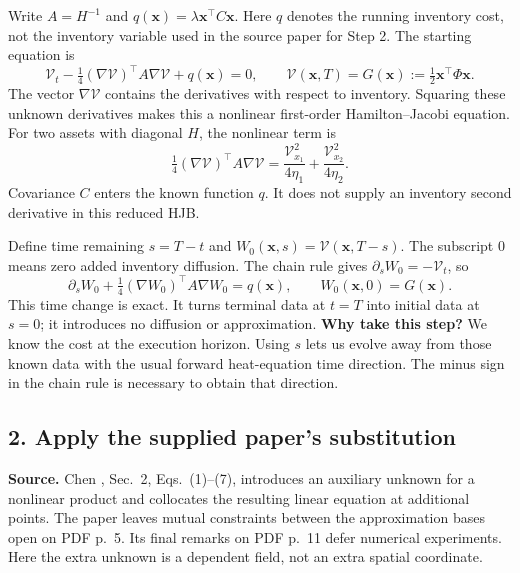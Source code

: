 \documentclass[11pt,a4paper]{article}
\begin{document}
Write $A=H^{-1}$ and $q(\mathbf x)=\lambda\mathbf x^\top C\mathbf x$.
Here $q$ denotes the running inventory cost, not the inventory variable
used in the source paper for Step 2. The starting equation is
\begin{equation}
 \mathcal V_t-\tfrac14(\nabla\mathcal V)^\top A\nabla\mathcal V
 +q(\mathbf x)=0,\qquad
 \mathcal V(\mathbf x,T)=G(\mathbf x)
 :=\tfrac12\mathbf x^\top\Phi\mathbf x.
 \label{eq:stage4-original}
\end{equation}
The vector $\nabla\mathcal V$ contains the derivatives with respect to
inventory. Squaring these unknown derivatives makes this a nonlinear
first-order Hamilton--Jacobi equation. For two assets with diagonal $H$,
the nonlinear term is
\[
 \tfrac14(\nabla\mathcal V)^\top A\nabla\mathcal V
 =\frac{\mathcal V_{x_1}^2}{4\eta_1}
 +\frac{\mathcal V_{x_2}^2}{4\eta_2}.
\]
Covariance $C$ enters the known function $q$. It does not supply an
inventory second derivative in this reduced HJB.

Define time remaining $s=T-t$ and
$W_0(\mathbf x,s)=\mathcal V(\mathbf x,T-s)$. The subscript $0$ means
zero added inventory diffusion. The chain rule gives
$\partial_sW_0=-\mathcal V_t$, so
\begin{equation}
 \boxed{\partial_sW_0+
 \tfrac14(\nabla W_0)^\top A\nabla W_0=q(\mathbf x),
 \qquad W_0(\mathbf x,0)=G(\mathbf x).}
 \label{eq:stage4-inviscid}
\end{equation}
This time change is exact. It turns terminal data at $t=T$ into initial
data at $s=0$; it introduces no diffusion or approximation.
\textbf{Why take this step?} We know the cost at the execution horizon.
Using $s$ lets us evolve away from those known data with the usual
forward heat-equation time direction. The minus sign in the chain rule
is necessary to obtain that direction.

\subsection*{2. Apply the supplied paper's substitution}

\textbf{Source.} Chen \cite{chen2001}, Sec.~2, Eqs.~(1)--(7),
introduces an auxiliary unknown for a nonlinear product and collocates the
resulting linear equation at additional points. The paper leaves mutual
constraints between the approximation bases open on PDF p.~5. Its final
remarks on PDF p.~11 defer numerical experiments. Here the extra unknown
is a dependent field, not an extra spatial coordinate.
\end{document}
